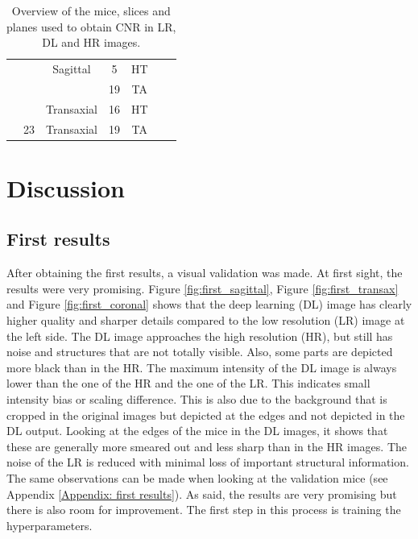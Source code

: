 \documentclass[twocolumn]{article}
\begin{document}
\begin{table}[h]
{\begin{tabular}{l|c|c|c|c|c|c}
     &    & Sagittal   & 5             &HT              &                 &                 &                   \\
     &    &            & 19            &TA              &                 &                 &                   \\
     &    & Transaxial & 16            &HT              &                 &                 &                   \\
    \midrule
     & 23 & Transaxial & 19            &TA              &                 &                 &                   \\
    \bottomrule
    \end{tabular}
    }
    \caption{\label{tab:CNR} Overview of the mice, slices and planes used to obtain CNR in LR, DL and HR images.}
\end{table}

\section{Discussion}
\subsection{First results}
After obtaining the first results, a visual validation was made. At first sight, the results were very promising. 
Figure \ref{fig:first_sagittal}, Figure \ref{fig:first_transax} and Figure \ref{fig:first_coronal} shows that the deep learning (DL) image has clearly higher quality and sharper details compared to the low resolution (LR) image at the left side. 
The DL image approaches the high resolution (HR), but still has noise and structures that are not totally visible. 
Also, some parts are depicted more black than in the HR.
The maximum intensity of the DL image is always lower than the one of the HR and the one of the LR. 
This indicates small intensity bias or scaling difference. This is also due to the background that is cropped in the original images but depicted at the edges and not depicted in the DL output. 
Looking at the edges of the mice in the DL images, it shows that these are generally more smeared out and less sharp than in the HR images. 
The noise of the LR is reduced with minimal loss of important structural information. 
The same observations can be made when looking at the validation mice (see Appendix \ref{Appendix: first results}).
As said, the results are very promising but there is also room for improvement. The first step in this process is training the hyperparameters. 
\end{document}
